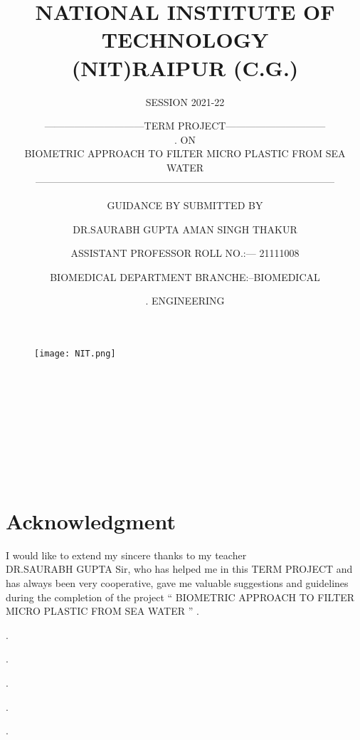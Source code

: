 \documentclass[12pt]{article}
\title{NATIONAL INSTITUTE OF TECHNOLOGY\\
(NIT)RAIPUR (C.G.)}
\author {SESSION 2021-22}
\date{}
\begin{document}
\maketitle
\begin{figure}[h]
\centering
\texttt{[image: NIT.png]}
\end{figure}
\author{------------------------------TERM PROJECT------------------------------ \\
.\> \>\> \>\> \>\>\> \>\> \>\>\>\>\>\>  \>\> \>\>\> \>\> \>\> \> \>\> \>\> \>\> \>\> ON\\ 
{BIOMETRIC APPROACH TO FILTER MICRO PLASTIC FROM SEA WATER }\\
------------------------------------------------------------------------------------------
 }\\


\author{GUIDANCE BY \> \>\> \>\> \>\>\> \>\> \>\>\>\>\>\>  \>\> \>\>\> \>\> \>\> \> \>\> \>\> \>\> \>\>  SUBMITTED BY }\\


\author{DR.SAURABH GUPTA\>  \>\> \>\> \>  \>\> \>\>\>\>\>  \>\> \>\>\>  \>\> \>\> \>  \>\> AMAN SINGH THAKUR }\\

\author{ ASSISTANT PROFESSOR\>  \>\> \>  \> \>   \>\> \>\> \> \>\> \> \>\> \>  ROLL NO.:--- 21111008 }\\
\author{BIOMEDICAL DEPARTMENT\>  \>\> \>\> \>  \>\> \>\> \>\>   \>\> BRANCHE:--BIOMEDICAL  }\\
\author{.\>   \>\> \>\> \>  \>\> \>\> \>\> \>\> \>\> \>  \>\> \>\> \>\>\>\> \>\> \>\>  \>\> \>\> \>\> \>\>\> \>\> \>   \>\> \>\> \>\> \>\>\> \>\> \>    \>\> \>\> \>\> \>\> \>\> \>  \>\> \>\> \>\>  \>\> ENGINEERING }
\clearpage
\tableofcontents
\clearpage
\section{Acknowledgment}

I would like to extend my sincere thanks to my teacher\\
DR.SAURABH GUPTA Sir, who has helped me in 
this TERM PROJECT and has
 always been very cooperative, gave me valuable suggestions and 
 guidelines during the completion of the project 
  “ BIOMETRIC APPROACH TO FILTER MICRO PLASTIC FROM SEA WATER ” .

.

.

.

.

.
\end{document}
